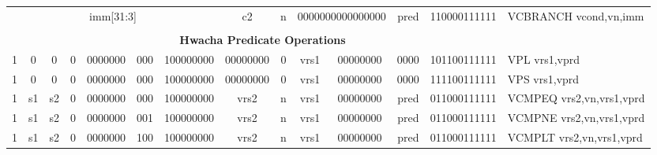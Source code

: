 \begin{landscape}
\begin{table}[p]
\begin{small}
\begin{center}
\begin{tabular}{p{0.08in}@{}p{0.08in}@{}p{0.08in}@{}p{0.08in}@{}p{0.50in}@{}p{0.30in}@{}p{0.08in}@{}p{0.8in}@{}p{0.48in}@{}p{0.32in}@{}p{0.08in}@{}p{0.8in}@{}p{0.8in}@{}p{0.4in}@{}p{0.56in}l}
\multicolumn{9}{|c|}{imm[31:3]} &
\multicolumn{1}{c|}{c2} &
\multicolumn{1}{c|}{n} &
\multicolumn{2}{c|}{0000000000000000} &
\multicolumn{1}{c|}{pred} &
\multicolumn{1}{c|}{110000111111} & VCBRANCH vcond,vn,imm \\
\cline{1-15}
  

&
\multicolumn{14}{c}{} & \\
&
\multicolumn{14}{c}{\bf Hwacha Predicate Operations} & \\
\cline{1-15}
  

\multicolumn{1}{|c|}{1} &
\multicolumn{1}{c|}{0} &
\multicolumn{1}{c|}{0} &
\multicolumn{1}{c|}{0} &
\multicolumn{1}{c|}{0000000} &
\multicolumn{1}{c|}{000} &
\multicolumn{2}{c|}{100000000} &
\multicolumn{2}{c|}{00000000} &
\multicolumn{1}{c|}{0} &
\multicolumn{1}{c|}{vrs1} &
\multicolumn{1}{c|}{00000000} &
\multicolumn{1}{c|}{0000} &
\multicolumn{1}{c|}{101100111111} & VPL vrs1,vprd \\
\cline{1-15}
  

\multicolumn{1}{|c|}{1} &
\multicolumn{1}{c|}{0} &
\multicolumn{1}{c|}{0} &
\multicolumn{1}{c|}{0} &
\multicolumn{1}{c|}{0000000} &
\multicolumn{1}{c|}{000} &
\multicolumn{2}{c|}{100000000} &
\multicolumn{2}{c|}{00000000} &
\multicolumn{1}{c|}{0} &
\multicolumn{1}{c|}{vrs1} &
\multicolumn{1}{c|}{00000000} &
\multicolumn{1}{c|}{0000} &
\multicolumn{1}{c|}{111100111111} & VPS vrs1,vprd \\
\cline{1-15}
  

\multicolumn{1}{|c|}{1} &
\multicolumn{1}{c|}{s1} &
\multicolumn{1}{c|}{s2} &
\multicolumn{1}{c|}{0} &
\multicolumn{1}{c|}{0000000} &
\multicolumn{1}{c|}{000} &
\multicolumn{2}{c|}{100000000} &
\multicolumn{2}{c|}{vrs2} &
\multicolumn{1}{c|}{n} &
\multicolumn{1}{c|}{vrs1} &
\multicolumn{1}{c|}{00000000} &
\multicolumn{1}{c|}{pred} &
\multicolumn{1}{c|}{011000111111} & VCMPEQ vrs2,vn,vrs1,vprd \\
\cline{1-15}
  

\multicolumn{1}{|c|}{1} &
\multicolumn{1}{c|}{s1} &
\multicolumn{1}{c|}{s2} &
\multicolumn{1}{c|}{0} &
\multicolumn{1}{c|}{0000000} &
\multicolumn{1}{c|}{001} &
\multicolumn{2}{c|}{100000000} &
\multicolumn{2}{c|}{vrs2} &
\multicolumn{1}{c|}{n} &
\multicolumn{1}{c|}{vrs1} &
\multicolumn{1}{c|}{00000000} &
\multicolumn{1}{c|}{pred} &
\multicolumn{1}{c|}{011000111111} & VCMPNE vrs2,vn,vrs1,vprd \\
\cline{1-15}
  

\multicolumn{1}{|c|}{1} &
\multicolumn{1}{c|}{s1} &
\multicolumn{1}{c|}{s2} &
\multicolumn{1}{c|}{0} &
\multicolumn{1}{c|}{0000000} &
\multicolumn{1}{c|}{100} &
\multicolumn{2}{c|}{100000000} &
\multicolumn{2}{c|}{vrs2} &
\multicolumn{1}{c|}{n} &
\multicolumn{1}{c|}{vrs1} &
\multicolumn{1}{c|}{00000000} &
\multicolumn{1}{c|}{pred} &
\multicolumn{1}{c|}{011000111111} & VCMPLT vrs2,vn,vrs1,vprd \\
\cline{1-15}
  


\end{tabular}
\end{center}
\end{small}
\end{table}
\end{landscape}
